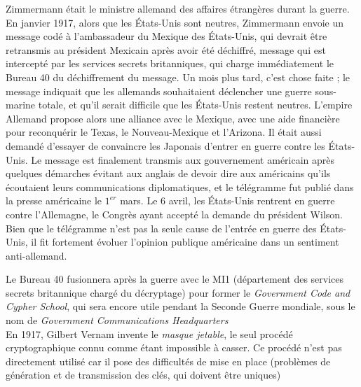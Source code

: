 Zimmermann était le ministre allemand des affaires étrangères durant la
guerre. En janvier 1917, alors que les États-Unis sont neutres,
Zimmermann envoie un message codé à l'ambassadeur du Mexique des
États-Unis, qui devrait être retransmis au président Mexicain après
avoir été déchiffré, message qui est intercepté par les services
secrets britanniques, qui charge immédiatement le Bureau 40 du
déchiffrement du message. Un mois plus tard, c'est chose faite ; le
message indiquait que les allemands souhaitaient déclencher une guerre
sous-marine totale, et qu'il serait difficile que les États-Unis
restent neutres. L'empire Allemand propose alors une alliance avec le
Mexique, avec une aide financière pour reconquérir le Texas, le
Nouveau-Mexique et l'Arizona. Il était aussi demandé d'essayer de
convaincre les Japonais d'entrer en guerre contre les États-Unis.
Le message est finalement transmis aux gouvernement américain après
quelques démarches évitant aux anglais de devoir dire aux américains
qu'ils écoutaient leurs communications diplomatiques, et le télégramme
fut publié dans la presse américaine le $1^{er}$ mars. Le 6 avril, les
États-Unis rentrent en guerre contre l'Allemagne, le Congrès ayant
accepté la demande du président Wilson. Bien que le télégramme n'est
pas la seule cause de l'entrée en guerre des États-Unis, il fit
fortement évoluer l'opinion publique américaine dans un sentiment
anti-allemand.

Le Bureau 40 fusionnera après la guerre avec le MI1 (département des
services secrets britannique chargé du décryptage) pour former le
\emph{Government Code and Cypher School}, qui sera encore utile
pendant la Seconde Guerre mondiale, sous le nom de \emph{Government
  Communications Headquarters} \\

En 1917, Gilbert Vernam invente le \emph{masque jetable}, le
seul procédé cryptographique connu comme étant impossible à casser. Ce
procédé n'est pas directement utilisé car il pose des difficultés de
mise en place (problèmes de génération et de transmission des clés,
qui doivent être uniques) \\%

